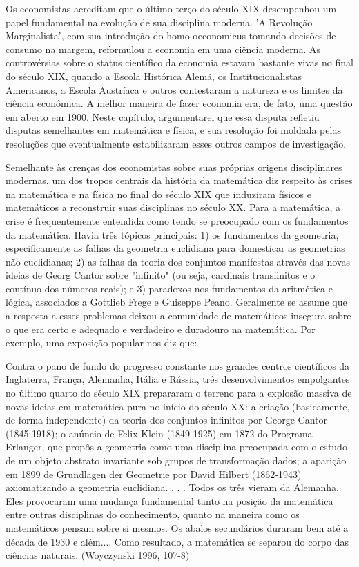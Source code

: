 \documentclass[a4paper,12pt]{article}[abntex2]
\begin{document}
Os economistas acreditam que o último terço do século XIX desempenhou um papel fundamental na evolução de sua disciplina moderna. 'A Revolução Marginalista', com sua introdução do homo oeconomicus tomando decisões de consumo na margem, reformulou a economia em uma ciência moderna. As controvérsias sobre o status científico da economia estavam bastante vivas no final do século XIX, quando a Escola Histórica Alemã, os Institucionalistas Americanos, a Escola Austríaca e outros contestaram a natureza e os limites da ciência econômica. A melhor maneira de fazer economia era, de fato, uma questão em aberto em 1900. Neste capítulo, argumentarei que essa disputa refletiu disputas semelhantes em matemática e física, e sua resolução foi moldada pelas resoluções que eventualmente estabilizaram esses outros campos de investigação.

Semelhante às crenças dos economistas sobre suas próprias origens disciplinares modernas, um dos tropos centrais da história da matemática diz respeito às crises na matemática e na física no final do século XIX que induziram físicos e matemáticos a reconstruir suas disciplinas no século XX. Para a matemática, a crise é frequentemente entendida como tendo se preocupado com os fundamentos da matemática. Havia três tópicos principais: 1) os fundamentos da geometria, especificamente as falhas da geometria euclidiana para domesticar as geometrias não euclidianas; 2) as falhas da teoria dos conjuntos manifestas através das novas ideias de Georg Cantor sobre "infinito" (ou seja, cardinais transfinitos e o contínuo dos números reais); e 3) paradoxos nos fundamentos da aritmética e lógica, associados a Gottlieb Frege e Guiseppe Peano. Geralmente se assume que a resposta a esses problemas deixou a comunidade de matemáticos insegura sobre o que era certo e adequado e verdadeiro e duradouro na matemática. Por exemplo, uma exposição popular nos diz que:

Contra o pano de fundo do progresso constante nos grandes centros científicos da Inglaterra, França, Alemanha, Itália e Rússia, três desenvolvimentos empolgantes no último quarto do século XIX prepararam o terreno para a explosão massiva de novas ideias em matemática pura no início do século XX: a criação (basicamente, de forma independente) da teoria dos conjuntos infinitos por George Cantor (1845-1918); o anúncio de Felix Klein (1849-1925) em 1872 do Programa Erlanger, que propôs a geometria como uma disciplina preocupada com o estudo de um objeto abstrato invariante sob grupos de transformação dados; a aparição em 1899 de Grundlagen der Geometrie por David Hilbert (1862-1943) axiomatizando a geometria euclidiana. . . . Todos os três vieram da Alemanha. Eles provocaram uma mudança fundamental tanto na posição da matemática entre outras disciplinas do conhecimento, quanto na maneira como os matemáticos pensam sobre si mesmos. Os abalos secundários duraram bem até a década de 1930 e além.... Como resultado, a matemática se separou do corpo das ciências naturais. (Woyczynski 1996, 107-8)
\end{document}

